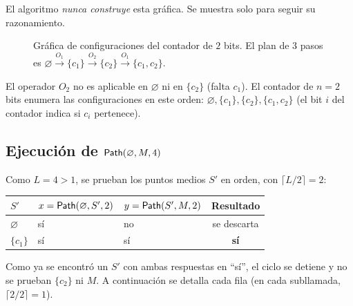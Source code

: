 \documentclass[11pt,letterpaper]{article}
\theoremstyle{plain}
\theoremstyle{definition}
\theoremstyle{remark}
\newcommand{\vacio}{\varnothing}
\newcommand{\nombreMat}[1]{\ensuremath{\text{\fontencoding{OT1}\fontfamily{cmss}\upshape\selectfont #1}}}
\newcommand{\Path}{\nombreMat{Path}}
\begin{document}
El algoritmo \emph{nunca construye} esta gráfica. Se muestra solo para seguir su razonamiento.

\begin{figure}[ht]
\centering
{}
\caption{Gráfica de configuraciones del contador de $2$ bits. El plan de $3$ pasos es $\vacio\xrightarrow{O_1}\{c_1\}\xrightarrow{O_2}\{c_2\}\xrightarrow{O_1}\{c_1,c_2\}$.}
\end{figure}

El operador $O_2$ no es aplicable en $\vacio$ ni en $\{c_2\}$ (falta $c_1$). El contador de $n=2$ bits enumera las configuraciones en este orden: $\vacio,\{c_1\},\{c_2\},\{c_1,c_2\}$ (el bit $i$ del contador indica si $c_i$ pertenece).

\subsection{Ejecución de $\Path(\vacio,M,4)$}

Como $L=4>1$, se prueban los puntos medios $S'$ en orden, con $\lceil L/2\rceil=2$:

\begin{center}
\begin{tabular}{@{}lllc@{}}
\toprule
$S'$ & $x=\Path(\vacio,S',2)$ & $y=\Path(S',M,2)$ & Resultado\\
\midrule
$\vacio$ & sí & no & se descarta\\
$\{c_1\}$ & sí & sí & \textbf{sí}\\
\bottomrule
\end{tabular}
\end{center}
Como ya se encontró un $S'$ con ambas respuestas en ``sí'', el ciclo se detiene y no se prueban $\{c_2\}$ ni $M$. A continuación se detalla cada fila (en cada subllamada, $\lceil 2/2\rceil=1$).
\end{document}
